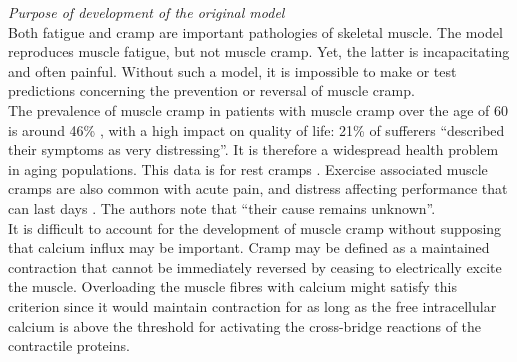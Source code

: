\documentclass[fleqn,10pt]{physiome}
\begin{document}
\textit{Purpose of development of the original model}\\\newline
Both fatigue and cramp are important pathologies of skeletal muscle. The \citet{shorten2007mathematical} model reproduces muscle fatigue, but not muscle cramp. Yet, the latter is incapacitating and often painful. Without such a model, it is impossible to make or test predictions concerning the prevention or reversal of muscle cramp.\\\newline
The prevalence of muscle cramp in patients with muscle cramp over the age of 60 is around 46\% \citep{maisonneuve2016prevalence}, with a high impact on quality of life: 21\% of sufferers “described their symptoms as very distressing”. It is therefore a widespread health problem in aging populations. This data is for rest cramps  \citep{naylor1994general}. Exercise associated muscle cramps are also common with acute pain, and distress affecting performance that can last days \citep{millerexercise}. The authors note that “their cause remains unknown”.\\\newline
It is difficult to account for the development of muscle cramp without supposing that calcium influx may be important. Cramp may be defined as a maintained contraction that cannot be immediately reversed by ceasing to electrically excite the muscle. Overloading the muscle fibres with calcium might satisfy this criterion since it would maintain contraction for as long as the free intracellular calcium is above the threshold for activating the cross-bridge reactions of the contractile proteins.
\end{document}
